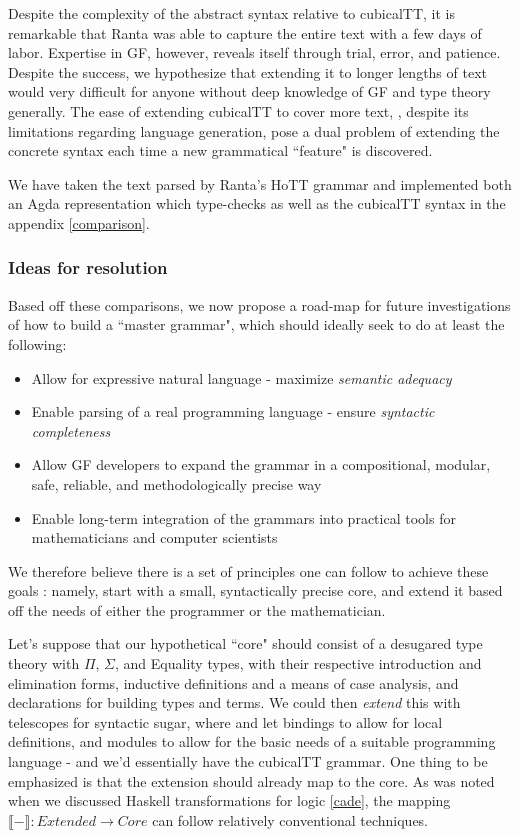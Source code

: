 Despite the complexity of the abstract syntax relative to cubicalTT, it is
remarkable that Ranta was able to capture the entire text with a few days of
labor. Expertise in GF, however, reveals itself through trial, error, and
patience. Despite the success, we hypothesize that extending it to longer
lengths of text would very difficult for anyone without deep knowledge of GF and
type theory generally. The ease of extending cubicalTT to cover more text,
, despite its limitations regarding language generation, pose a dual problem of
extending the concrete syntax each time a new grammatical ``feature" is discovered.

We have taken the text parsed by Ranta's HoTT grammar and implemented both an
Agda representation which type-checks as well as the cubicalTT syntax in the
appendix \ref{comparison}.

\subsubsection{Ideas for resolution}

Based off these comparisons, we now propose a road-map for future investigations 
of how to build a ``master grammar", which should ideally seek to do at least the following:

\begin{itemize}
\item Allow for expressive natural language - maximize \emph{semantic adequacy}
\item Enable parsing of a real programming language - ensure \emph{syntactic completeness}
\item Allow GF developers to expand the grammar in a compositional, modular, safe, reliable,
  and methodologically precise way
\item Enable long-term integration of the grammars into practical tools for
  mathematicians and computer scientists
\end{itemize}

We therefore believe there is a set of principles one can follow to achieve
these goals : namely, start with a small, syntactically precise core, and extend
it based off the needs of either the programmer or the mathematician.

Let's suppose that our hypothetical ``core" should consist of a desugared type
theory with $\Pi$, $\Sigma$, and Equality types, with their respective
introduction and elimination forms, inductive definitions and a means of case
analysis, and declarations for building types and terms. We could then
\emph{extend} this with telescopes for syntactic sugar, where and let bindings
to allow for local definitions, and modules to allow for the basic needs of a
suitable programming language - and we'd essentially have the cubicalTT grammar.
One thing to be emphasized is that the extension should already map to the core.
As was noted when we discussed Haskell transformations for logic \ref{cade}, the
mapping $\llbracket - \rrbracket : Extended \to Core$ can follow relatively
conventional techniques.

